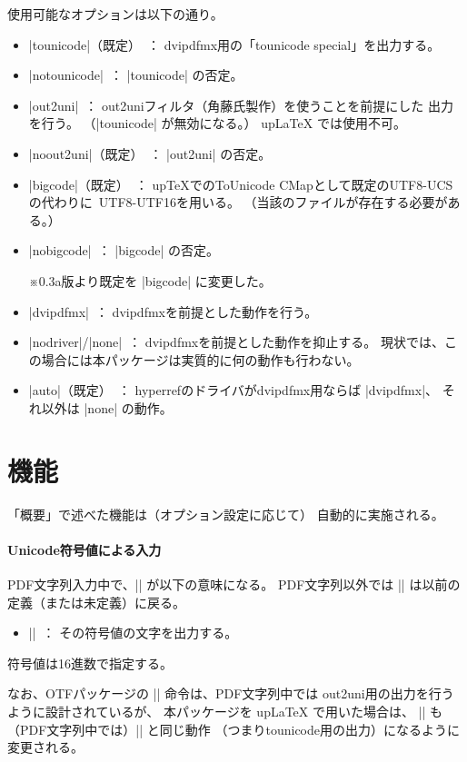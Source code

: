 \documentclass[a4paper]{jsarticle}
\newcommand{\Pkg}[1]{\textsf{#1}}
\newcommand{\Note}{\par\noindent ※}
\newcommand{\Means}{~：\quad}
\providecommand{\pTeX}{p\TeX}
\providecommand{\upTeX}{u\pTeX}
\providecommand{\pLaTeX}{p\LaTeX}
\providecommand{\upLaTeX}{u\pLaTeX}
\begin{document}
使用可能なオプションは以下の通り。
\begin{itemize}
\item |tounicode|（既定）\Means
  dvipdfmx用の「tounicode special」を出力する。
\item |notounicode|\Means
  |tounicode| の否定。
\item |out2uni|\Means
  out2uniフィルタ（角藤氏製作）を使うことを前提にした
  出力を行う。
  （|tounicode| が無効になる。）
  {\upLaTeX} では使用不可。
\item |noout2uni|（既定）\Means
  |out2uni| の否定。
\item |bigcode|（既定）\Means
  {\upTeX}でのToUnicode CMapとして既定のUTF8-UCSの代わりに\ 
  UTF8-UTF16を用いる。
  （当該のファイルが存在する必要がある。）
\item |nobigcode|\Means
  |bigcode| の否定。
  \Note 0.3a版より既定を |bigcode| に変更した。
\item |dvipdfmx|\Means
  dvipdfmxを前提とした動作を行う。
\item |nodriver|/|none|\Means
  dvipdfmxを前提とした動作を抑止する。
  現状では、この場合には本パッケージは実質的に何の動作も行わない。
\item |auto|（既定）\Means
  \Pkg{hyperref}のドライバがdvipdfmx用ならば |dvipdfmx|、
  それ以外は |none| の動作。
\end{itemize}

\section{機能}

「概要」で述べた機能は（オプション設定に応じて）
自動的に実施される。

\paragraph{Unicode符号値による入力}
PDF文字列入力中で、|\Ux| が以下の意味になる。
PDF文字列以外では |\Ux| は以前の定義（または未定義）に戻る。

\begin{itemize}
\item ||\Means
  その符号値の文字を出力する。
\end{itemize}

符号値は16進数で指定する。

なお、\Pkg{OTF}パッケージの |\UTF| 命令は、PDF文字列中では
out2uni用の出力を行うように設計されているが、
本パッケージを {\upLaTeX} で用いた場合は、
|\UTF| も（PDF文字列中では）|\Ux| と同じ動作
（つまりtounicode用の出力）になるように変更される。
\end{document}
